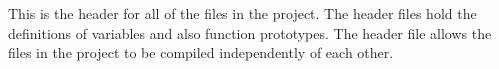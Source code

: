 This is the header for all of the files in the project. The header files hold the definitions of variables and also function prototypes. The header file allows the files in the project to be compiled independently of each other.
